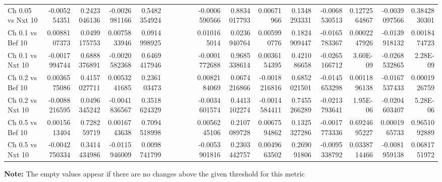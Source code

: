 \begin{table*}
{\begin{tabular}{|l|n{5}{2}n{5}{2}|n{5}{2}n{5}{2}|n{5}{2}n{5}{2}|n{5}{2}n{5}{2}|n{5}{2}n{5}{2}|n{5}{2}n{5}{2}|n{5}{2}n{5}{2}|n{5}{2}n{5}{2}|}
Ch 0.05 vs Nxt 10                    & -0.005254351                                & 0.2423046136                      & -0.0026981166                      & 0.5482354924  &&&&                    & -0.0006590566 & 0.8834017793 & 0.00671966    & 0.1348293331 & -0.0068530513 & 0.1272564867 & -0.0039097566 & 0.3842830301              \\
Ch 0.1 vs Bef 10                     & 0.0088107373                                & 0.0499175753                      & 0.0075833946                       & 0.0914998925 &&&&                     & 0.010165014   & 0.0236940764 & 0.005990776   & 0.1824909447 & -0.0165783367 & 0.0002247926 & -0.0139918132 & 0.0018474723         \\
Ch 0.1 vs Nxt 10                     & -0.0017994744                               & 0.6888376891                      & -0.0020582368                      & 0.6469417946 &&&&                     & -0.0001772688 & 0.9685338614 & 0.0036154395  & 0.421086658  & -0.0265166712 & 3.60E-09     & -0.0268532865 & 2.28E-09              \\
Ch 0.2 vs Bef 10                     & 0.0036575086                                & 0.4157027711                      & 0.0053241685                       & 0.236103473 &&&&                      & 0.0082184069  & 0.0674216866 & -0.0018216816 & 0.6852021501 & -0.0145653298 & 0.0011896138 & -0.0167537433 & 0.0001926759             \\
Ch 0.2 vs Nxt 10                     & -0.0088216595                               & 0.0496345242                      & -0.0041836567                      & 0.3518624329 &&&&                     & -0.0034601574 & 0.4413102274 & -0.0014584411 & 0.7455266289 & -0.0213793641 & 1.95E-06     & -0.0204603407 & 5.28E-06         \\
Ch 0.5 vs Bef 10                     & 0.0015613404                                & 0.728259719                       & 0.0016743638                       & 0.7094518998 &&&&                     & 0.0056245106  & 0.2107089728 & 0.0067594862  & 0.1325327286 & -0.0017773336 & 0.6924695227 & 0.0001965733  & 0.9651092889      \\
Ch 0.5 vs Nxt 10                     & -0.0042750334                               & 0.3414434986                      & -0.0115946009                      & 0.0098741799 &&&&                     & -0.0053901816 & 0.2303442757 & 0.0049663502  & 0.269091806  & -0.0095338792 & 0.0338714466 & -0.0081959138 & 0.0681751972 \\
\hline         
\end{tabular}
}
\begin{tablenotes}
\small
\item \textbf{Note:} The empty values appear if there are no changes above the given threshold for this metric
\end{tablenotes}
\end{table*}